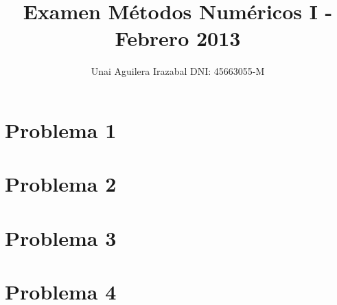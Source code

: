 \documentclass[a4paper, 12pt]{article}
\title{Examen Métodos Numéricos I - Febrero 2013}
\author{Unai Aguilera Irazabal DNI: 45663055-M}
\begin{document}
\maketitle

\section*{Problema 1}

\section*{Problema 2}

\section*{Problema 3}

\section*{Problema 4}
\end{document}
